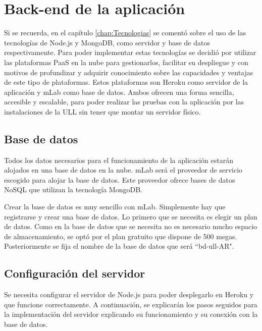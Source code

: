 % 


\section{Back-end de la aplicación} \label{chap:BackEnd} 

Si se recuerda, en el capítulo \ref{chap:Tecnologias} se comentó sobre el uso de las tecnologías de Node.js y MongoDB, como servidor y base de datos respectivamente. Para poder implementar estas tecnologías se decidió por utilizar las plataformas PaaS en la nube para gestionarlos, facilitar su despliegue y con motivos de profundizar y adquirir conocimiento sobre las capacidades y ventajas de este tipo de plataformas. Estos plataformas son Heroku como servidor de la aplicación y mLab como base de datos. Ambos ofrecen una forma sencilla, accesible y escalable, para poder realizar las pruebas con la aplicación por las instalaciones de la ULL sin tener que montar un servidor físico.

\subsection{Base de datos}

Todos los datos necesarios para el funcionamiento de la aplicación estarán alojados en una base de datos en la nube. mLab será el proveedor de servicio escogido para alojar la base de datos. Este proveedor ofrece bases de datos NoSQL que utilizan la tecnología MongoDB.

Crear la base de datos es muy sencillo con mLab. Simplemente hay que registrarse y crear una base de datos. Lo primero que se necesita es elegir un plan de datos. Como en la base de datos que se necesita no es necesario mucho espacio de almacenamiento, se optó por el plan gratuito que dispone de 500 megas. Posteriormente se fija el nombre de la base de datos que será ``bd-ull-AR".

\subsection{Configuración del servidor}

Se necesita configurar el servidor de Node.js para poder desplegarlo en Heroku y que funcione correctamente. A continuación, se explicarán los pasos seguidos para la implementación del servidor explicando su funcionamiento y su conexión con la base de datos.

